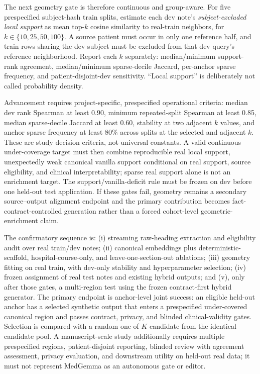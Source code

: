 \documentclass[11pt]{article}
\begin{document}
The next geometry gate is therefore continuous and group-aware.  For five prespecified subject-hash train splits, estimate each dev note's \emph{subject-excluded local support} as mean top-$k$ cosine similarity to real-train neighbors, for $k\in\{10,25,50,100\}$.  A source patient must occur in only one reference half, and train rows sharing the dev subject must be excluded from that dev query's reference neighborhood.  Report each $k$ separately: median/minimum support-rank agreement, median/minimum sparse-decile Jaccard, per-anchor sparse frequency, and patient-disjoint-dev sensitivity.  ``Local support'' is deliberately not called probability density.

Advancement requires project-specific, prespecified operational criteria: median dev rank Spearman at least 0.90, minimum repeated-split Spearman at least 0.85, median sparse-decile Jaccard at least 0.60, stability at two adjacent $k$ values, and anchor sparse frequency at least 80\% across splits at the selected and adjacent $k$.  These are study decision criteria, not universal constants.  A valid continuous under-coverage target must then combine reproducible real local support, unexpectedly weak canonical vanilla support conditional on real support, source eligibility, and clinical interpretability; sparse real support alone is not an enrichment target.  The support/vanilla-deficit rule must be frozen on dev before one held-out test application.  If these gates fail, geometry remains a secondary source--output alignment endpoint and the primary contribution becomes fact-contract-controlled generation rather than a forced cohort-level geometric-enrichment claim.

The confirmatory sequence is: (i) streaming raw-heading extraction and eligibility audit over real train/dev notes; (ii) canonical embeddings plus deterministic-scaffold, hospital-course-only, and leave-one-section-out ablations; (iii) geometry fitting on real train, with dev-only stability and hyperparameter selection; (iv) frozen assignment of real test notes and existing hybrid outputs; and (v), only after those gates, a multi-region test using the frozen contract-first hybrid generator.  The primary endpoint is anchor-level joint success: an eligible held-out anchor has a selected synthetic output that enters a prespecified under-covered canonical region and passes contract, privacy, and blinded clinical-validity gates.  Selection is compared with a random one-of-$K$ candidate from the identical candidate pool.  A manuscript-scale study additionally requires multiple prespecified regions, patient-disjoint reporting, blinded review with agreement assessment, privacy evaluation, and downstream utility on held-out real data; it must not represent MedGemma as an autonomous gate or editor.
\end{document}
